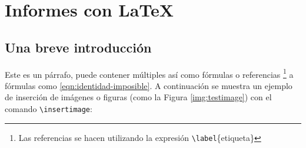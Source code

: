 %
%

\section{Informes con \LaTeX}
	
	\subsection{Una breve introducción}
		
		Este es un párrafo, puede contener múltiples  así como fórmulas o referencias \footnote{Las referencias se hacen utilizando la expresión \texttt{\textbackslash label}\{etiqueta\}} a fórmulas como \eqref{eqn:identidad-imposible}. A continuación se muestra un ejemplo de inserción de imágenes o figuras (como la Figura \ref{img:testimage}) con el comando \texttt{\textbackslash insertimage}:
		
		
